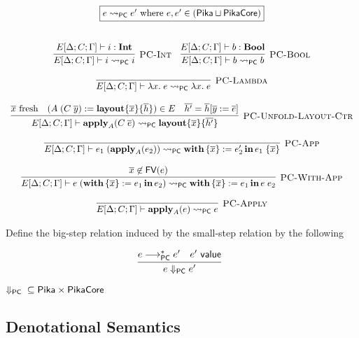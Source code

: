 \[
  \begin{array}{c}
    \fbox{$e \pcNotionStep e'\textrm{ where $e, e' \in (\Pika \sqcup \PikaCore)$}$}
    \fboxNewlines
    \labinfer[PC-Int]{E[\Delta;C;\Gamma] \vdash i \pcNotionStep i}{E[\Delta;C;\Gamma] \vdash i : \Int}
    ~~~
    \labinfer[PC-Bool]{E[\Delta;C;\Gamma] \vdash b \pcNotionStep b}{E[\Delta;C;\Gamma] \vdash b : \Bool}
    \\\\
    \labinfer[PC-Lambda]{E[\Delta;C;\Gamma] \vdash \lambda x.\; e \pcNotionStep \lambda x.\; e}{}
    \\\\
    \labinfer[PC-Unfold-Layout-Ctr]{E[\Delta;C;\Gamma] \vdash \apply_A(C\; \overline{e}) \pcNotionStep \sslmath{\overline{x}}{\overline{h'}}}
      {\fresh{\overline{x}}
      & (A\; (C\; \overline{y}) := \sslmath{\overline{x}}{\overline{h}}) \in E
      & \overline{h'} = \overline{h}[\overline{y} := \overline{e}]
      }
    \\\\
    \labinfer[PC-App]{E[\Delta;C;\Gamma] \vdash e_1\;(\apply_A(e_2)) \pcNotionStep \withIn{\{ \overline{x} \} := e_2'} e_1\; \{\overline{x}\}}
      {}
    \\\\
    \labinfer[PC-With-App]{E[\Delta;C;\Gamma] \vdash e\; (\withIn{\{ \overline{x} \} := e_1} e_2) \pcNotionStep \withIn{\{ \overline{x} \} := e_1} e\; e_2}
      {\overline{x} \not\in \FV(e)}
    \\\\
    \labinfer[PC-Apply]{E[\Delta;C;\Gamma] \vdash \apply_A(e) \pcNotionStep e}
      {}
  \end{array}
\]

Define the big-step relation induced by the small-step relation by the following

\[
  \begin{array}{c}
    \labinfer{e \pcStep e'}
      {e \pcsteps e' & e' ~\val}
  \end{array}
\]

\begin{theorem} $\Downarrow_{\textsf{PC}}{} \subseteq \textsf{Pika} \times \textsf{PikaCore}$
\end{theorem}

\subsection{Denotational Semantics}


